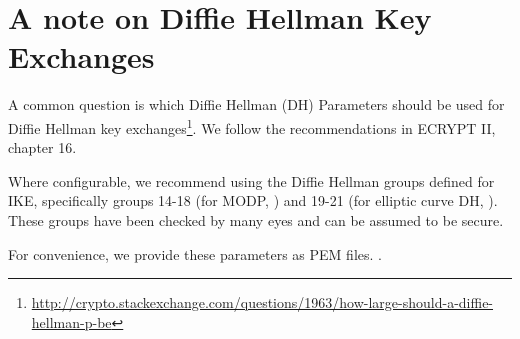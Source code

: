 \section{A note on Diffie Hellman Key Exchanges}
\label{section:DH}

A common question is which Diffie Hellman (DH) Parameters  should be used for Diffie Hellman key exchanges\footnote{\url{http://crypto.stackexchange.com/questions/1963/how-large-should-a-diffie-hellman-p-be}}. We follow the recommendations in ECRYPT II, chapter 16.\cite{ii2011ecrypt}

Where configurable, we recommend using the Diffie Hellman groups
defined for IKE, specifically groups 14-18 (for MODP, \cite{rfc3526})
and 19-21 (for elliptic curve DH, \cite{rfc5903}). These groups have
been checked by many eyes and can be assumed to be secure.

For convenience, we provide these parameters as PEM files. .
